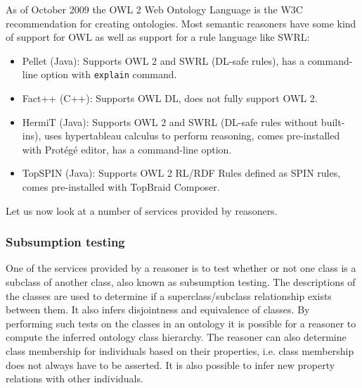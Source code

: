 As of October 2009 the \ac{OWL} 2 Web Ontology Language is the W3C recommendation for creating ontologies. Most semantic reasoners have some kind of support for \ac{OWL} as well as support for a rule language like \ac{SWRL}:

\begin{itemize}
	\item Pellet (Java): Supports \ac{OWL} 2 and \ac{SWRL} (DL-safe rules), has a command-line option with \texttt{explain} command.
 	\item Fact++ (C++): Supports \ac{OWL} DL, does not fully support \ac{OWL} 2.
	\item HermiT (Java): Supports \ac{OWL} 2 and \ac{SWRL} (DL-safe rules without built-ins), uses hypertableau calculus to perform reasoning, comes pre-installed with Prot\'eg\'e editor, has a command-line option.
	\item TopSPIN (Java): Supports \ac{OWL} 2 RL/RDF Rules defined as \ac{SPIN} rules, comes pre-installed with TopBraid Composer.
\end{itemize}



Let us now look at a number of services provided by reasoners. %

\subsubsection{Subsumption testing}

One of the services provided by a reasoner is to test whether or not one class is a subclass of another class, also known as subsumption testing. The descriptions of the classes are used to determine if a superclass/subclass relationship exists between them. It also infers disjointness and equivalence of classes. By performing such tests on the classes in an ontology it is possible for a reasoner to compute the inferred ontology class hierarchy. The reasoner can also determine class membership for individuals based on their properties, i.e. class membership does not always have to be asserted. It is also possible to infer new property relations with other individuals.

